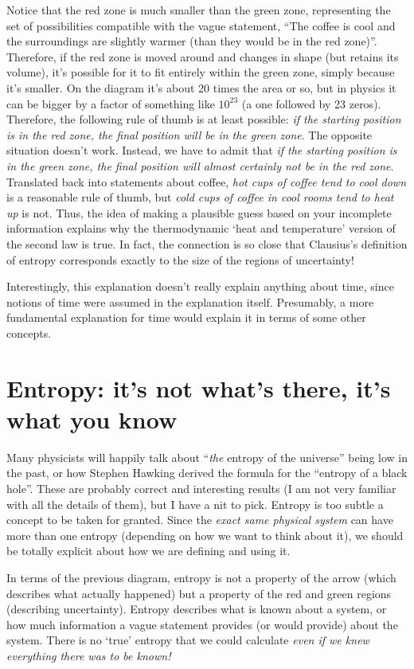 \documentclass[a4paper, 12pt]{article}
\begin{document}
Notice that the red zone is much smaller than the green zone,
representing the set of possibilities compatible with the vague statement,
``The coffee is cool and the surroundings are slightly warmer (than they
would be in the red zone)''. Therefore, if the red zone is moved around and
changes in shape (but retains its volume), it's possible for it to fit entirely
within the green zone, simply because it's smaller.
On the diagram it's about 20 times the area or so,
but in physics it can be bigger by a factor of something like $10^{23}$
(a one followed by 23 zeros). Therefore, the following rule of thumb is at least
possible: {\em if the starting position is in the red zone, the final position
will be in the green zone}. The opposite situation doesn't work. Instead, we
have to admit that
{\em if the starting position is in the green zone, the final position will
almost certainly not be in the red zone}. Translated back into statements about
coffee, {\em hot cups of coffee tend to cool down} is a reasonable rule of
thumb, but {\em cold cups of coffee in cool rooms tend to heat up} is not.
Thus, the idea of making a plausible guess based on your incomplete information
explains why the thermodynamic `heat and temperature' version of the
second law is true. In fact, the connection is so close that
Clausius's definition of entropy corresponds exactly to the size of the
regions of uncertainty!

Interestingly, this explanation doesn't really explain anything about time,
since notions of time were assumed in the explanation itself. Presumably,
a more fundamental explanation for time would explain it in terms of some
other concepts.

\section*{Entropy: it's not what's there, it's what you know}
Many physicists will
happily talk about ``{\em the} entropy of the universe'' being low in the past,
or how Stephen Hawking derived the formula for the
``entropy of a black hole''. These are
probably correct and interesting results (I am not very familiar with all the
details of them), but I have a nit to pick.
Entropy is too subtle a concept to be taken for granted.
Since the {\em exact same physical system}
can have more than one entropy (depending on how we want to think about it),
we should be totally explicit about how we are defining and using it.

In terms of the previous diagram, entropy is not a property of the arrow
(which describes what actually happened) but a property of the red and green regions
(describing uncertainty).
Entropy describes what is known about a system, or how much information a
vague statement provides (or would provide) about the system.
There is no `true' entropy that
we could calculate {\em even if we knew everything there was to be known!}
\end{document}
